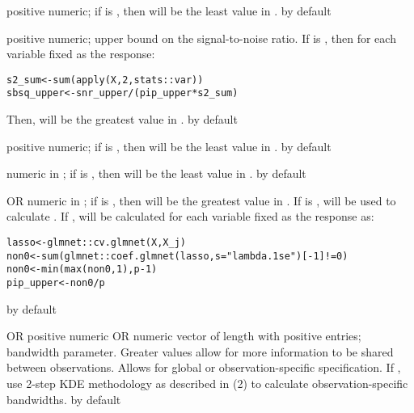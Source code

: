 \documentclass[a4paper]{book}
\begin{document}
\begin{Arguments}
\begin{ldescription}
\item[\code{ssq\_lower}] positive numeric; if  is , then  will
be the least value in .  by default

\item[\code{snr\_upper}] positive numeric; upper bound on the signal-to-noise ratio.
If  is , then for each variable  fixed as the
response:

\begin{alltt}s2_sum <- sum(apply(X, 2, stats::var))
sbsq_upper <- snr_upper / (pip_upper * s2_sum)
\end{alltt}


Then,  will be the greatest value in .  by default

\item[\code{sbsq\_lower}] positive numeric; if  is , then 
will be the least value in .  by default

\item[\code{pip\_lower}] numeric in ; if  is , then
 will be the least value in .  by default

\item[\code{pip\_upper}]  OR  numeric in ; if  is , then
 will be the greatest value in . If  is ,
 will be used to calculate . If , 
will be calculated for each variable  fixed as the response as:

\begin{alltt}lasso <- glmnet::cv.glmnet(X, X_j)
non0 <- sum(glmnet::coef.glmnet(lasso, s = "lambda.1se")[-1] != 0)
non0 <- min(max(non0, 1), p - 1)
pip_upper <- non0 / p
\end{alltt}


 by default

\item[\code{tau}]  OR positive numeric OR numeric vector of length 
with positive entries; bandwidth parameter. Greater values allow for more
information to be shared between observations. Allows for global or
observation-specific specification. If , use 2-step KDE methodology as
described in (2) to calculate observation-specific bandwidths.  by
default


\end{ldescription}
\end{Arguments}
\end{document}
